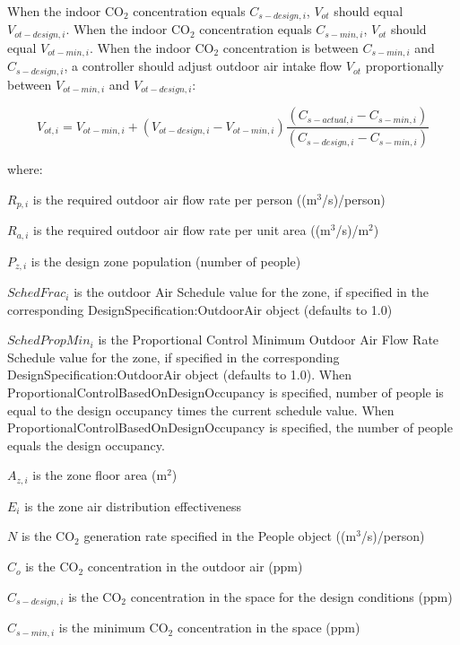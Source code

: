 When the indoor CO\(_{2}\) concentration equals \({C_{s - design,i}}\), \({V_{ot}}\) should equal \({V_{ot - design,i}}\). When the indoor CO\(_{2}\) concentration equals \({C_{s - min,i}}\), \({V_{ot}}\) should equal \({V_{ot - min,i}}\). When the indoor CO\(_{2}\) concentration is between \({C_{s - min,i}}\) and \({C_{s - design,i}}\), a controller should adjust outdoor air intake flow \({V_{ot}}\) proportionally between \({V_{ot - min,i}}\) and \({V_{ot - design,i}}\):

\begin{equation}
{V_{ot,i}} = {V_{ot - min,i}} + ({V_{ot - design,i}} - {V_{ot - min,i}})\frac{{({C_{s - actual,i}} - {C_{s - min,i}})}}{{({C_{s - design,i}} - {C_{s - min,i}})}}
\end{equation}

where:

\({R_{p,i}}\) is the required outdoor air flow rate per person ((m\(^{3}\)/s)/person)

\({R_{a,i}}\) is the required outdoor air flow rate per unit area ((m\(^{3}\)/s)/m\(^{2}\))

\({P_{z,i}}\) is the design zone population (number of people)

\({SchedFrac_i}\) is the outdoor Air Schedule value for the zone, if specified in the corresponding DesignSpecification:OutdoorAir object (defaults to 1.0)

\({SchedPropMin_i}\) is the Proportional Control Minimum Outdoor Air Flow Rate Schedule value for the zone, if specified in the corresponding DesignSpecification:OutdoorAir object (defaults to 1.0).  When ProportionalControlBasedOnDesignOccupancy is specified, number of people is equal to the design occupancy times the current schedule value.  When ProportionalControlBasedOnDesignOccupancy is specified, the number of people equals the design occupancy.

\({A_{z,i}}\) is the zone floor area (m\(^{2}\))

\({E_i}\) is the zone air distribution effectiveness

\(N\) is the CO\(_{2}\) generation rate specified in the People object ((m\(^{3}\)/s)/person)

\({C_o}\) is the CO\(_{2}\) concentration in the outdoor air (ppm)

\({C_{s - design,i}}\) is the CO\(_{2}\) concentration in the space for the design conditions (ppm)

\({C_{s - min,i}}\) is the minimum CO\(_{2}\) concentration in the space (ppm)

